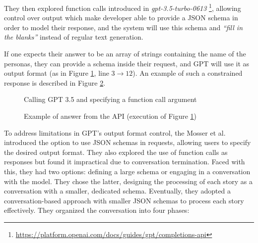 They then explored function calls introduced in \emph{gpt-3.5-turbo-0613} \footnote{\href{https://platform.openai.com/docs/guides/gpt/completions-api}{https://platform.openai.com/docs/guides/gpt/completions-api}}, allowing control over output which make developer able to provide a JSON schema in order to model their response, and the system will use this schema and \emph{\enquote{fill in the blanks}} instead of regular text generation.
\begin{example}
If one expects their answer to be an array of strings containing the name of the personas, they can provide a schema inside their request, and GPT will use it as output format (as in Figure \ref{fig:calling_gpt}, line $3 \rightarrow  12$). An example of such a constrained response is described in Figure \ref{fig:gpt_answer}.
\begin{figure}

\caption{Calling GPT 3.5 and specifying a function call argument  \cite{arulmohan2023extracting}}\label{fig:calling_gpt}
\end{figure}
\begin{figure}

\caption{Example of answer from the API (execution of Figure \ref{fig:calling_gpt})  \cite{arulmohan2023extracting}}\label{fig:gpt_answer}
\end{figure}
\end{example}
To address limitations in GPT's output format control, the Mosser et al. introduced the option to use JSON schemas in requests, allowing users to specify the desired output format. They also explored the use of function calls as responses but found it impractical due to conversation termination. Faced with this, they had two options: defining a large schema or engaging in a conversation with the model. They chose the latter, designing the processing of each story as a conversation with a smaller, dedicated schema.
Eventually, they adopted a conversation-based approach with smaller JSON schemas to process each story effectively. 
They organized the conversation into four phases:
